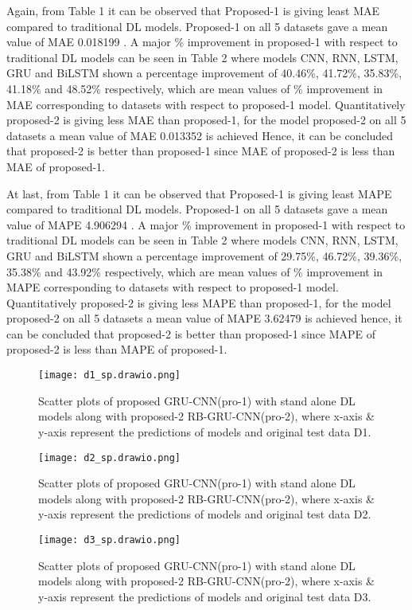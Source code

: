 Again,  from Table 1 it can be observed that  Proposed-1 is giving least MAE compared to traditional DL models. Proposed-1 on all 5 datasets gave a mean value of MAE 0.018199 . A major \% improvement in proposed-1 with respect to traditional DL models can be seen in Table 2 where models CNN,  RNN,  LSTM,  GRU and BiLSTM shown a percentage improvement of 40.46\%,  41.72\%,  35.83\%,  41.18\% and 48.52\% respectively,  which are mean values of \% improvement in MAE corresponding to datasets with respect to proposed-1 model. Quantitatively proposed-2 is giving less MAE than proposed-1,  for the model proposed-2 on all 5 datasets a mean value of MAE 0.013352 is achieved Hence,  it can be concluded that proposed-2 is better than proposed-1 since MAE of proposed-2 is less than MAE of proposed-1.

At last,  from Table 1 it can be observed that  Proposed-1 is giving least MAPE compared to traditional DL models. Proposed-1 on all 5 datasets gave a mean value of MAPE 4.906294 . A major \% improvement in proposed-1 with respect to traditional DL models can be seen in Table 2 where models CNN,  RNN,  LSTM,  GRU and BiLSTM shown a percentage improvement of 29.75\%,  46.72\%,  39.36\%,  35.38\% and 43.92\% respectively,  which are mean values of \% improvement in MAPE corresponding to datasets with respect to proposed-1 model. Quantitatively proposed-2 is giving less MAPE than proposed-1,  for the model proposed-2 on all 5 datasets a mean value of MAPE 3.62479 is achieved hence,  it can be concluded that proposed-2 is better than proposed-1 since MAPE of proposed-2 is less than MAPE of proposed-1.
 \begin{figure*}[h!]
   \centering
   \texttt{[image: d1\_sp.drawio.png]}
    \caption{Scatter plots of proposed GRU-CNN(pro-1) with stand alone DL models along with proposed-2 RB-GRU-CNN(pro-2), where x-axis \& y-axis represent the predictions of models and original test data D1.}
    \label{Fig:6}
   \end{figure*}
   \begin{figure*}[h!]
    \centering
     \texttt{[image: d2\_sp.drawio.png]}
     \caption{Scatter plots of proposed GRU-CNN(pro-1) with stand alone DL models along with proposed-2 RB-GRU-CNN(pro-2), where x-axis \& y-axis represent the predictions of models and original test data D2.}
     \label{Fig:7}
  \end{figure*}
  \begin{figure*}[h!]
     \centering
     \texttt{[image: d3\_sp.drawio.png]}
     \caption{Scatter plots of proposed GRU-CNN(pro-1) with stand alone DL models along with proposed-2 RB-GRU-CNN(pro-2), where x-axis \& y-axis represent the predictions of models and original test data D3.}
     \label{Fig:8}
   \end{figure*}
